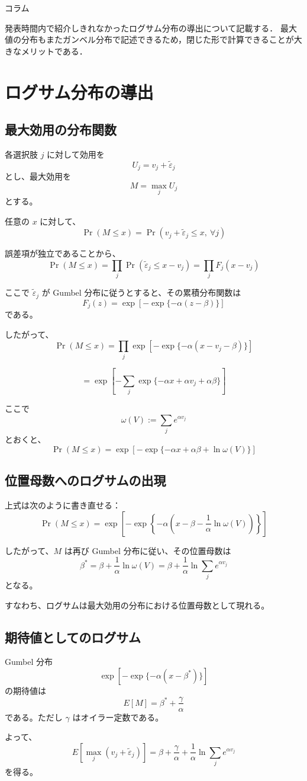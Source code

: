 \clearpage
\begin{column}{コラム}



発表時間内で紹介しきれなかったログサム分布の導出について記載する．
最大値の分布もまたガンベル分布で記述できるため，閉じた形で計算できることが大きなメリットである．


\section{ログサム分布の導出}

\subsection{最大効用の分布関数}

各選択肢 $j$ に対して効用を
\[
U_j = v_j + \tilde{\varepsilon}_j
\]
とし、最大効用を
\[
M = \max_j U_j
\]
とする。

任意の $x$ に対して、
\[
\Pr(M \le x)
=
\Pr(v_j + \tilde{\varepsilon}_j \le x, \ \forall j)
\]

誤差項が独立であることから、
\[
\Pr(M \le x)
=
\prod_j \Pr(\tilde{\varepsilon}_j \le x - v_j)
=
\prod_j F_j(x - v_j)
\]

ここで $\tilde{\varepsilon}_j$ が Gumbel 分布に従うとすると、その累積分布関数は
\[
F_j(z)
=
\exp\left[
-\exp\{-\alpha(z - \beta)\}
\right]
\]
である。

したがって、
\[
\Pr(M \le x)
=
\prod_j
\exp\left[
-\exp\{-\alpha(x - v_j - \beta)\}
\right]
\]

\[
=
\exp\left[
-\sum_j \exp\{-\alpha x + \alpha v_j + \alpha \beta\}
\right]
\]

ここで
\[
\omega(V) := \sum_j e^{\alpha v_j}
\]
とおくと、
\[
\Pr(M \le x)
=
\exp\left[
-\exp\{-\alpha x + \alpha \beta + \ln \omega(V)\}
\right]
\]


\subsection{位置母数へのログサムの出現}

上式は次のように書き直せる：
\[
\Pr(M \le x)
=
\exp\left[
-\exp\left\{
-\alpha \left(
x - \beta - \frac{1}{\alpha} \ln \omega(V)
\right)
\right\}
\right]
\]

したがって、$M$ は再び Gumbel 分布に従い、その位置母数は
\[
\beta^\ast
=
\beta + \frac{1}{\alpha} \ln \omega(V)
=
\beta + \frac{1}{\alpha} \ln \sum_j e^{\alpha v_j}
\]
となる。

すなわち、ログサムは最大効用の分布における位置母数として現れる。

\subsection{期待値としてのログサム}

Gumbel 分布
\[
\exp\left[
-\exp\{-\alpha(x - \beta^\ast)\}
\right]
\]
の期待値は
\[
E[M] = \beta^\ast + \frac{\gamma}{\alpha}
\]
である。ただし $\gamma$ はオイラー定数である。

よって、
\[
E\left[\max_j (v_j + \tilde{\varepsilon}_j)\right]
=
\beta + \frac{\gamma}{\alpha}
+
\frac{1}{\alpha} \ln \sum_j e^{\alpha v_j}
\]
を得る。

\end{column}
\clearpage
